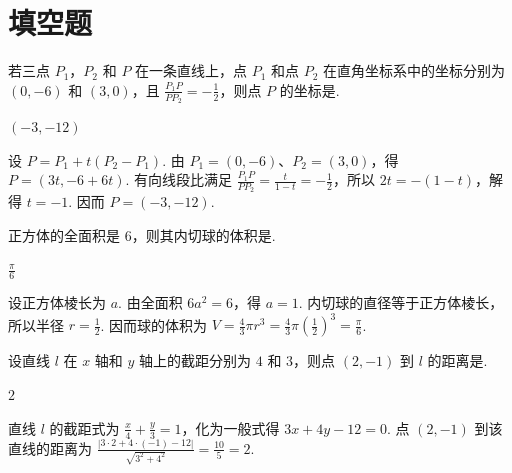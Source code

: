 \documentclass[UTF8,a4paper,oneside,11pt]{ctexbook}
\begin{document}
\section{填空题}

\begin{problem}

若三点 \(P_{1}\)，\(P_{2}\) 和 \(P\) 在一条直线上，点 \(P_{1}\) 和点 \(P_{2}\) 在直角坐标系中的坐标分别为 \((0,-6)\) 和 \((3,0)\)，且 \(\frac{P_{1}P}{PP_{2}}=-\frac{1}{2}\)，则点 \(P\) 的坐标是\fillinblank{}.
\end{problem}

\begin{answer}
\(\left( -3,-12 \right)\)
\end{answer}

\begin{solution}
设 \(P=P_1+t(P_2-P_1)\). 由 \(P_1=(0,-6)\)、\(P_2=(3,0)\)，得 \(P=(3t,-6+6t)\). 有向线段比满足 \(\frac{P_1P}{PP_2}=\frac{t}{1-t}=-\frac12\)，所以 \(2t=-(1-t)\)，解得 \(t=-1\). 因而 \(P=(-3,-12)\).
\end{solution}

\begin{problem}

正方体的全面积是 \(6\)，则其内切球的体积是\fillinblank{}.
\end{problem}

\begin{answer}
\(\frac{\pi}{6}\)
\end{answer}

\begin{solution}
设正方体棱长为 \(a\). 由全面积 \(6a^2=6\)，得 \(a=1\). 内切球的直径等于正方体棱长，所以半径 \(r=\frac12\). 因而球的体积为 \(V=\frac43\pi r^3=\frac43\pi\left(\frac12\right)^3=\frac{\pi}{6}\).
\end{solution}

\begin{problem}

设直线 \(l\) 在 \(x\) 轴和 \(y\) 轴上的截距分别为 \(4\) 和 \(3\)，则点 \((2, -1)\) 到 \(l\) 的距离是\fillinblank{}.
\end{problem}

\begin{answer}
\(2\)
\end{answer}

\begin{solution}
直线 \(l\) 的截距式为 \(\frac{x}{4}+\frac{y}{3}=1\)，化为一般式得 \(3x+4y-12=0\). 点 \((2,-1)\) 到该直线的距离为 \(\frac{|3\cdot2+4\cdot(-1)-12|}{\sqrt{3^2+4^2}}=\frac{10}{5}=2\).
\end{solution}
\end{document}
